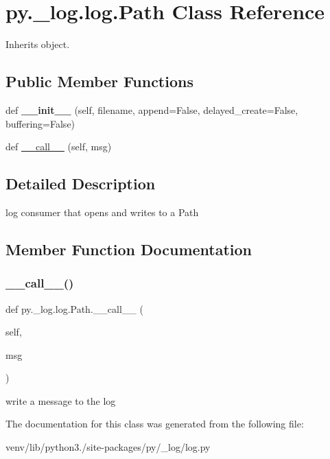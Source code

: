 \hypertarget{classpy_1_1__log_1_1log_1_1_path}{}\section{py.\+\_\+log.\+log.\+Path Class Reference}
\label{classpy_1_1__log_1_1log_1_1_path}


Inherits object.

\subsection*{Public Member Functions}
\begin{DoxyCompactItemize}
\item 
\mbox{\label{classpy_1_1__log_1_1log_1_1_path_ad4467045a784c6f6b00e6529b871bb35}} 
def {\bfseries \+\_\+\+\_\+init\+\_\+\+\_\+} (self, filename, append=False, delayed\+\_\+create=False, buffering=False)
\item 
def \hyperlink{classpy_1_1__log_1_1log_1_1_path_addbb6a4d82f90636695b87514683be96}{\+\_\+\+\_\+call\+\_\+\+\_\+} (self, msg)
\end{DoxyCompactItemize}


\subsection{Detailed Description}
\begin{DoxyVerb}log consumer that opens and writes to a Path \end{DoxyVerb}
 

\subsection{Member Function Documentation}
\mbox{\label{classpy_1_1__log_1_1log_1_1_path_addbb6a4d82f90636695b87514683be96}} 
\subsubsection{\texorpdfstring{\+\_\+\+\_\+call\+\_\+\+\_\+()}{\_\_call\_\_()}}
{\footnotesize\ttfamily def py.\+\_\+log.\+log.\+Path.\+\_\+\+\_\+call\+\_\+\+\_\+ (\begin{DoxyParamCaption}\item[{}]{self,  }\item[{}]{msg }\end{DoxyParamCaption})}

\begin{DoxyVerb}write a message to the log \end{DoxyVerb}
 

The documentation for this class was generated from the following file\+:\begin{DoxyCompactItemize}
\item 
venv/lib/python3./site-\/packages/py/\+\_\+log/log.\+py\end{DoxyCompactItemize}
